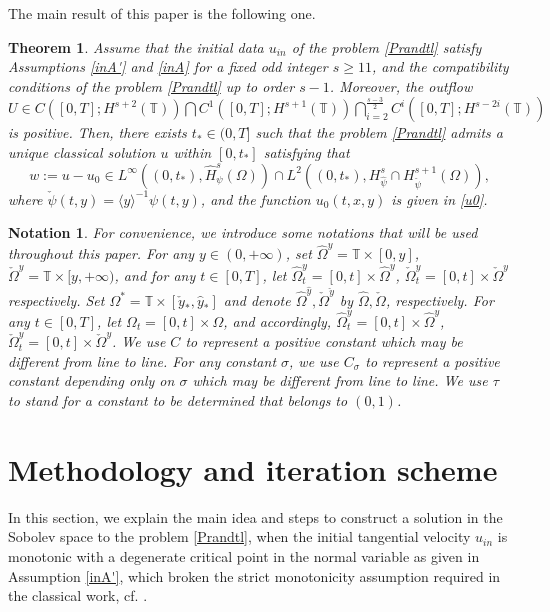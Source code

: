 \documentclass{amsart}
\numberwithin{equation}{section}
\newtheorem{notation}{Notation}[section]
\newtheorem{theorem}{Theorem}[section]
\newcommand\y{{{\langle y \rangle}}}
\begin{document}
The main result of this paper is the following one.
\begin{theorem}\label{MR}
Assume that the initial data $u_{in}$ of the problem \eqref{Prandtl} satisfy  Assumptions \ref{inA'} and \ref{inA} for  a fixed odd integer $s\geq 11$, and the compatibility conditions of the problem \eqref{Prandtl} up to order $s-1$. Moreover, the outflow
$U\in C([0,T];H^{s+2}(\mathbb{T}))\bigcap C^{1}([0,T];H^{s+1}(\mathbb{T}))\bigcap\limits_{i=2}^{\frac{s-3}{2}}C^{i}([0,T];H^{s-2i}(\mathbb{T}))$ is positive.
Then, there exists $t_{*}\in(0,T]$ such that the problem \eqref{Prandtl} admits a unique classical solution $u$ within $[0,t_{*}]$ satisfying that
$$w:=u-u_{0}\in L^{\infty}((0, t_{*}), \hat{H}_{\psi}^{s}(\Omega))\cap L^{2}((0, t_{*}), H_{\hat{\psi}}^{s}\cap H_{\check{\psi}}^{s+1}(\Omega)),$$
where $ \check{\psi}(t,y)=\y^{-1}\psi(t,y)$, and the function $u_0(t,x,y)$ is given in \eqref{u0}.
\end{theorem}

\begin{notation}
For convenience, we introduce some notations that will be used throughout this paper. For any $y\in(0,+\infty)$, set $\hat{\Omega}^{y}=\mathbb{T}\times[0,y]$,  $\check{\Omega}^{y}=\mathbb{T}\times[y,+\infty)$, and for any $t\in[0,T]$, let
$\hat{\Omega}_{t}^{y}=[0,t]\times\hat{\Omega}^{y}$,
$\check{\Omega}_{t}^{y}=[0,t]\times\check{\Omega}^{y}$ respectively.
Set ${\Omega}^{*}=\mathbb{T}\times[\check{y}_{*},\hat{y}_{*}]$ and denote $\hat{\Omega}^{\hat{y}}, \check{\Omega}^{\check{y}}$ by $\hat{\Omega}, \check{\Omega}$, respectively. For any $t\in[0,T]$, let $\Omega_{t}=[0,t]\times\Omega$, and accordingly, $\hat{\Omega}_{t}^{y}=[0,t]\times\hat{\Omega}^{y}$, $\check{\Omega}_{t}^{y}=[0,t]\times\check{\Omega}^{y}$.
We use $C$ to represent a positive constant which may be different from line to line.
For any constant $\sigma$, we use $C_{\sigma}$ to represent a positive constant depending only on $\sigma$ which may be different from line to line. We use $\tau$ to stand for a constant to be determined that belongs to $(0,1)$.
	
	
\end{notation}


\section{Methodology and iteration scheme}

In this section, we explain the main idea and steps to construct a solution in the Sobolev space to the problem \eqref{Prandtl}, when the initial tangential velocity $u_{in}$ is monotonic with a degenerate critical point in the normal variable as given in Assumption \ref{inA'}, which broken the strict monotonicity assumption required in the classical work, cf. \cite{Oleinik, Ole, AWXY, MW}.
\end{document}
